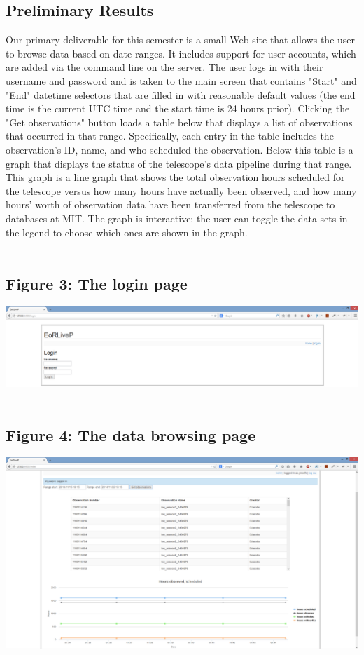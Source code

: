\documentclass[12pt]{article}
\begin{document}
\begin{spacing}{1.5}
\section{Preliminary Results}
Our primary deliverable for this semester is a small Web site that allows the user to browse data based on date ranges. It includes support for user accounts, which are added via the command line on the server. The user logs in with their username and password and is taken to the main screen that contains "Start" and "End" datetime selectors that are filled in with reasonable default values (the end time is the current UTC time and the start time is 24 hours prior). Clicking the "Get observations" button loads a table below that displays a list of observations that occurred in that range. Specifically, each entry in the table includes the observation's ID, name, and who scheduled the observation. Below this table is a graph that displays the status of the telescope's data pipeline during that range. This graph is a line graph that shows the total observation hours scheduled for the telescope versus how many hours have actually been observed, and how many hours' worth of observation data have been transferred from the telescope to databases at MIT. The graph is interactive; the user can toggle the data sets in the legend to choose which ones are shown in the graph.
\\ \\
\subsection{Figure 3: The login page}
\includegraphics[width=\textwidth]{screenshot1}
\\ \\
\subsection{Figure 4: The data browsing page}
\includegraphics[width=\textwidth]{screenshot2}

\end{spacing}
\end{document}
